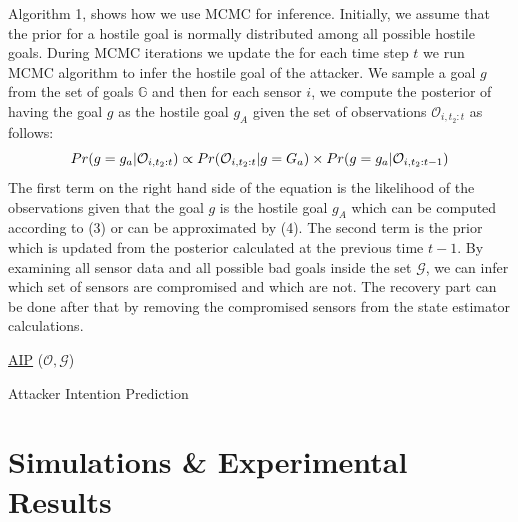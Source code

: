 \documentclass[conference]{IEEEtran}
\begin{document}
Algorithm 1, shows how we use MCMC for inference.
Initially, we assume that the prior for a hostile goal is normally distributed among all  possible hostile goals. During MCMC iterations we update the for each time step $t$ we run MCMC algorithm to infer the hostile goal of the attacker. We sample a goal $g$ from the set of goals $\mathbb{G}$ and then for each sensor $i$, we compute the posterior of having the goal $g$ as the hostile goal $g_A$ given the set of observations $\mathcal{O}_{i,t_2:t}$ as follows:
\begin{equation} Pr(g=g_a|\mathcal{O}_{i,t_2:t}) \propto Pr(\mathcal{O}_{i,t_2:t} | g = G_a) \\ \times Pr(g=g_a|\mathcal{O}_{i,t_2:t-1})
\end{equation}
The first term on the right hand side of the equation is the likelihood of the observations given that the goal $g$ is the hostile goal $g_A$ which can be computed according to (3) or can be approximated by (4). The second term is the prior which is updated from the posterior calculated at the previous time $t-1$.
By examining all sensor data and all possible bad goals inside the set $\mathcal{G}$, we can infer which set of sensors are compromised and which are not. The recovery part can be done after that by removing the compromised sensors from the state estimator calculations.
\begin{algorithm}
    \underline{AIP} ($\mathcal{O}, \mathcal{G}$)\;
    {
    }
    \caption{Attacker Intention Prediction}
\end{algorithm}
\section{Simulations \& Experimental Results}\label{sec:conclusion}
\end{document}
